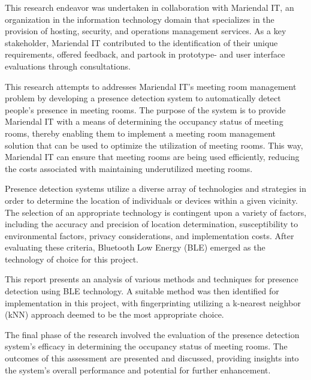 This research endeavor was undertaken in collaboration with Mariendal IT, an organization in the information technology domain that specializes in the provision of hosting, security, and operations management services\cite{Mariendal_OmOs}.
As a key stakeholder, Mariendal IT contributed to the identification of their unique requirements, offered feedback, and partook in prototype- and user interface evaluations through consultations.

This research attempts to addresses Mariendal IT's meeting room management problem by developing a presence detection system to automatically detect people's presence in meeting rooms.
The purpose of the system is to provide Mariendal IT with a means of determining the occupancy status of meeting rooms, thereby enabling them to implement a meeting room management solution that can be used to optimize the utilization of meeting rooms.
This way, Mariendal IT can ensure that meeting rooms are being used efficiently, reducing the costs associated with maintaining underutilized meeting rooms.

Presence detection systems utilize a diverse array of technologies and strategies in order to determine the location of individuals or devices within a given vicinity.
The selection of an appropriate technology is contingent upon a variety of factors, including the accuracy and precision of location determination, susceptibility to environmental factors, privacy considerations, and implementation costs.
After evaluating these criteria, Bluetooth Low Energy (BLE) emerged as the technology of choice for this project.

This report presents an analysis of various methods and techniques for presence detection using BLE technology.
A suitable method was then identified for implementation in this project, with fingerprinting utilizing a k-nearest neighbor (kNN) approach deemed to be the most appropriate choice.

The final phase of the research involved the evaluation of the presence detection system's efficacy in determining the occupancy status of meeting rooms.
The outcomes of this assessment are presented and discussed, providing insights into the system's overall performance and potential for further enhancement.
